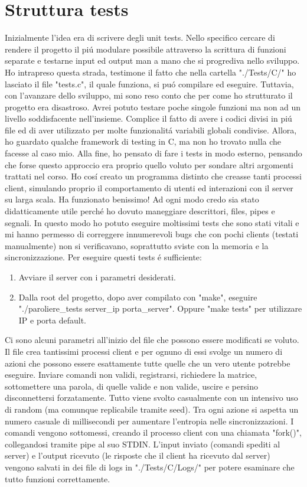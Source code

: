 \chapter{Struttura tests}

Inizialmente l'idea era di scrivere degli unit tests. Nello specifico cercare di rendere il progetto il pi\'u modulare possibile attraverso la scrittura di funzioni separate e testarne input ed output man a mano che si progrediva nello sviluppo. Ho intrapreso questa strada, testimone il fatto che nella cartella "./Tests/C/" ho lasciato il file "tests.c", il quale funziona, si pu\'o compilare ed eseguire. Tuttavia, con l'avanzare dello sviluppo, mi sono reso conto che per come ho strutturato il progetto era disastroso. Avrei potuto testare poche singole funzioni ma non ad un livello soddisfacente nell'insieme. Complice il fatto di avere i codici divisi in pi\'u file ed di aver utilizzato per molte funzionalit\'a variabili globali condivise. Allora, ho guardato qualche framework di testing in C, ma non ho trovato nulla che facesse al caso mio. Alla fine, ho pensato di fare i tests in modo esterno, pensando che forse questo approccio era proprio quello voluto per sondare altri argomenti trattati nel corso. Ho cos\'i creato un programma distinto che creasse tanti processi client, simulando proprio il comportamento di utenti ed interazioni con il server su larga scala. Ha funzionato benissimo! Ad ogni modo credo sia stato didatticamente utile perch\'e ho dovuto maneggiare descrittori, files, pipes e segnali. In questo modo ho potuto eseguire moltissimi tests che sono stati vitali e mi hanno permesso di correggere innumerevoli bugs che con pochi clients (testati manualmente) non si verificavano, soprattutto sviste con la memoria e la sincronizzazione. Per eseguire questi tests \'e sufficiente:

\begin{enumerate}
  \item Avviare il server con i parametri desiderati.
  \item Dalla root del progetto, dopo aver compilato con "make", eseguire "./paroliere\_tests server\_ip porta\_server". Oppure "make tests" per utilizzare IP e porta default.
\end{enumerate}
\leavevmode
Ci sono alcuni parametri all'inizio del file che possono essere modificati se voluto. Il file crea tantissimi processi client e per ognuno di essi svolge un numero di azioni che possono essere esattamente tutte quelle che un vero utente potrebbe eseguire. Inviare comandi non validi, registrarsi, richiedere la matrice, sottomettere una parola, di quelle valide e non valide, uscire e persino disconnettersi forzatamente. Tutto viene svolto casualmente con un intensivo uso di random (ma comunque replicabile tramite seed). Tra ogni azione si aspetta un numero casuale di millisecondi per aumentare l'entropia nelle sincronizzazioni. I comandi vengono sottomessi, creando il processo client con una chiamata "fork()", collegandosi tramite pipe al suo STDIN. L'input inviato (comandi spediti al server) e l'output ricevuto (le risposte che il client ha ricevuto dal server) vengono salvati in dei file di logs in "./Tests/C/Logs/" per potere esaminare che tutto funzioni correttamente.

